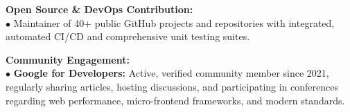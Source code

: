 \documentclass[letterpaper,10pt]{article}
\begin{document}
\begin{itemize}[leftmargin=0.15in, label={}]
{{    \textbf{Open Source \& DevOps Contribution:} \\ \vspace{1pt}
    \quad $\bullet$ Maintainer of 40+ public GitHub projects and repositories with integrated, automated CI/CD and comprehensive unit testing suites. \\ \vspace{4pt}
    
    \textbf{Community Engagement:} \\ \vspace{1pt}
    \quad $\bullet$ \textbf{Google for Developers:} Active, verified community member since 2021, regularly sharing articles, hosting discussions, and participating in conferences regarding web performance, micro-frontend frameworks, and modern standards.
  }}
\end{itemize}
\end{document}
